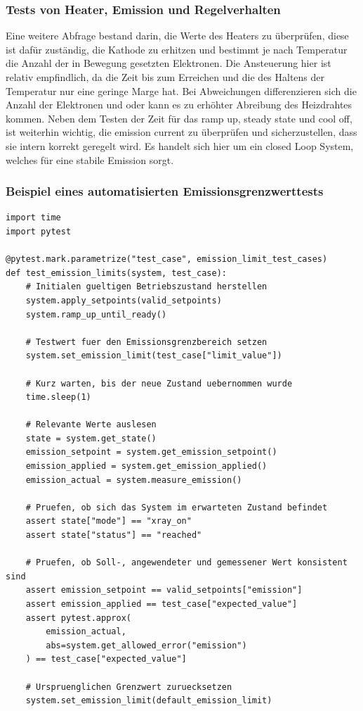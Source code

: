 \documentclass[12pt]{article} %
\begin{document}
\subsubsection{Tests von Heater, Emission und Regelverhalten}
Eine weitere Abfrage bestand darin, die Werte des Heaters zu überprüfen, diese ist dafür zuständig, die Kathode zu erhitzen und bestimmt je nach Temperatur die Anzahl der in Bewegung gesetzten Elektronen. Die Ansteuerung hier ist relativ empfindlich, da die Zeit bis zum Erreichen und die des Haltens der Temperatur nur eine geringe Marge hat.
Bei Abweichungen differenzieren sich die Anzahl der Elektronen und oder kann es zu erhöhter Abreibung des Heizdrahtes kommen. Neben dem Testen der Zeit für das ramp up, steady state und cool off, ist weiterhin wichtig, die emission current zu überprüfen und sicherzustellen, dass sie intern korrekt geregelt wird. Es handelt sich hier um ein closed Loop System, welches für eine stabile Emission sorgt.
\\
\subsubsection{Beispiel eines automatisierten Emissionsgrenzwerttests}

\begin{lstlisting}[style=pythonwide, caption={Vereinfachtes Beispiel eines automatisierten Pytest-Grenzwerttests für Emissionslimits}, label={lst:emission_limits}]
import time
import pytest

@pytest.mark.parametrize("test_case", emission_limit_test_cases)
def test_emission_limits(system, test_case):
    # Initialen gueltigen Betriebszustand herstellen
    system.apply_setpoints(valid_setpoints)
    system.ramp_up_until_ready()

    # Testwert fuer den Emissionsgrenzbereich setzen
    system.set_emission_limit(test_case["limit_value"])

    # Kurz warten, bis der neue Zustand uebernommen wurde
    time.sleep(1)

    # Relevante Werte auslesen
    state = system.get_state()
    emission_setpoint = system.get_emission_setpoint()
    emission_applied = system.get_emission_applied()
    emission_actual = system.measure_emission()

    # Pruefen, ob sich das System im erwarteten Zustand befindet
    assert state["mode"] == "xray_on"
    assert state["status"] == "reached"

    # Pruefen, ob Soll-, angewendeter und gemessener Wert konsistent sind
    assert emission_setpoint == valid_setpoints["emission"]
    assert emission_applied == test_case["expected_value"]
    assert pytest.approx(
        emission_actual,
        abs=system.get_allowed_error("emission")
    ) == test_case["expected_value"]

    # Urspruenglichen Grenzwert zuruecksetzen
    system.set_emission_limit(default_emission_limit)
\end{lstlisting}
\end{document}
